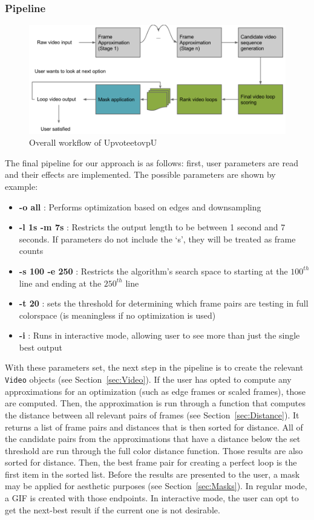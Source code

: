 \subsubsection{Pipeline}
\label{sec:Pipeline}
\begin{figure}
\centering
\includegraphics[width=1.0\textwidth]{loop-pipeline.png}
\caption{Overall workflow of UpvoteetovpU}
\label{fig:Pipeline}
\end{figure}
The final pipeline for our approach is as follows: first, user parameters are read and their effects are implemented. The possible parameters are shown by example:
\begin{itemize}
\item \textbf{-o all} : Performs optimization based on edges and downsampling
\item \textbf{-l 1s -m 7s} : Restricts the output length to be between 1 second and 7 seconds. If parameters do not include the `s', they will be treated as frame counts
\item \textbf{-s 100 -e 250} : Restricts the algorithm's search space to starting at the $100^{th}$ line and ending at the $250^{th}$ line
\item \textbf{-t 20} : sets the threshold for determining which frame pairs are testing in full colorspace (is meaningless if no optimization is used)
\item \textbf{-i} : Runs in interactive mode, allowing user to see more than just the single best output
\end{itemize}

With these parameters set, the next step in the pipeline is to create the relevant \texttt{Video} objects (see Section~\ref{sec:Video}). If the user has opted to compute any approximations for an optimization (such as edge frames or scaled frames), those are computed. Then, the approximation is run through a function that computes the distance between all relevant pairs of frames (see Section~\ref{sec:Distance}). It returns a list of frame pairs and distances that is then sorted for distance. All of the candidate pairs from the approximations that have a distance below the set threshold are run through the full color distance function. Those results are also sorted for distance. Then, the best frame pair for creating a perfect loop is the first item in the sorted list. Before the results are presented to the user, a mask may be applied for aesthetic purposes (see Section~\ref{sec:Masks}). In regular mode, a GIF is created with those endpoints. In interactive mode, the user can opt to get the next-best result if the current one is not desirable.


